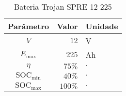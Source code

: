 
\begin{table}[ht]
	\centering
	\caption{Bateria Trojan SPRE 12 225}\label{tbl:bateria}
    \begin{tabular}{c r l}
		\hline
		Parâmetro    &   Valor & Unidade\\
		\hline
		\hline
		$V$                         &  $12$    & V       \\
		$E_{\text{max}}$            &  $225$   & Ah      \\
		$\eta$                      &  $75\%$  & $\cdot$ \\
		$\text{SOC}_{\text{min}}$   &  $40\%$  & $\cdot$ \\
		$\text{SOC}_{\text{max}}$   &  $100\%$ & $\cdot$ \\
		\hline
	\end{tabular}
\end{table}
